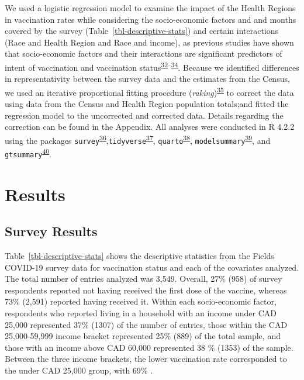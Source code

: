 \documentclass[
  letterpaper,
  DIV=11,
  numbers=noendperiod]{scrartcl}
\begin{document}
We used a logistic regression model to examine the impact of the Health
Regions in vaccination rates while considering the socio-economic
factors and and months covered by the survey
(Table~\ref{tbl-descriptive-stats}) and certain interactions (Race and
Health Region and Race and income), as previous studies have shown that
socio-economic factors and their interactions are significant predictors
of intent of vaccination and vaccination
status\textsuperscript{\protect\hyperlink{ref-nguyen2022}{32}--\protect\hyperlink{ref-cnat2022a}{34}}.
Because we identified differences in representativity between the survey
data and the estimates from the Census, we used an iterative
proportional fitting procedure
(\emph{raking})\textsuperscript{\protect\hyperlink{ref-deming1940}{35}}
to correct the data using data from the Census and Health Region
population totals;and fitted the regression model to the uncorrected and
corrected data. Details regarding the correction can be found in the
Appendix. All analyses were conducted in R 4.2.2 using the packages
\texttt{survey}\textsuperscript{\protect\hyperlink{ref-lumley2011}{36}},\texttt{tidyverse}\textsuperscript{\protect\hyperlink{ref-wickham2019}{37}},
\texttt{quarto}\textsuperscript{\protect\hyperlink{ref-quarto}{38}},
\texttt{modelsummary}\textsuperscript{\protect\hyperlink{ref-modelsummary}{39}},
and
\texttt{gtsummary}\textsuperscript{\protect\hyperlink{ref-gtsummary}{40}}.

\hypertarget{results}{%
\section{Results}\label{results}}

\hypertarget{survey-results}{%
\subsection{Survey Results}\label{survey-results}}

Table~\ref{tbl-descriptive-stats} shows the descriptive statistics from
the Fields COVID-19 survey data for vaccination status and each of the
covariates analyzed. The total number of entries analyzed was 3,549.
Overall, 27\% (958) of survey respondents reported not having received
the first dose of the vaccine, whereas 73\% (2,591) reported having
received it. Within each socio-economic factor, respondents who reported
living in a household with an income under CAD 25,000 represented 37\%
(1307) of the number of entries, those within the CAD 25,000-59,999
income bracket represented 25\% (889) of the total sample, and those
with an income above CAD 60,000 represented 38 \% (1353) of the sample.
Between the three income brackets, the lower vaccination rate
corresponded to the under CAD 25,000 group, with 69\% .
\end{document}
